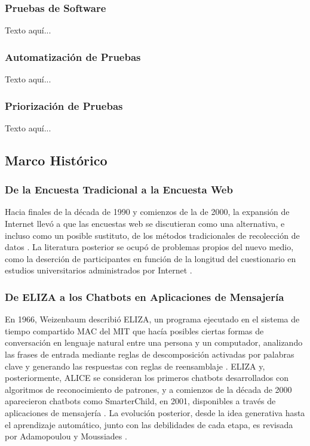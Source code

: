 \documentclass[12pt,letterpaper]{article}
\begin{document}
\subsubsection{Pruebas de Software}
Texto aquí...

\subsubsection{Automatización de Pruebas}
Texto aquí...

\subsubsection{Priorización de Pruebas}
Texto aquí...

\subsection{Marco Histórico}

\subsubsection{De la Encuesta Tradicional a la Encuesta Web}
 
Hacia finales de la década de 1990 y comienzos de la de 2000, la expansión de Internet llevó a que las encuestas web se discutieran como una alternativa, e incluso como un posible sustituto, de los métodos tradicionales de recolección de datos \cite{couper2000}. La literatura posterior se ocupó de problemas propios del nuevo medio, como la deserción de participantes en función de la longitud del cuestionario en estudios universitarios administrados por Internet \cite{hoerger2010}.
 
\subsubsection{De ELIZA a los Chatbots en Aplicaciones de Mensajería}
 
En 1966, Weizenbaum describió ELIZA, un programa ejecutado en el sistema de tiempo compartido MAC del MIT que hacía posibles ciertas formas de conversación en lenguaje natural entre una persona y un computador, analizando las frases de entrada mediante reglas de descomposición activadas por palabras clave y generando las respuestas con reglas de reensamblaje \cite{weizenbaum1966}. ELIZA y, posteriormente, ALICE se consideran los primeros chatbots desarrollados con algoritmos de reconocimiento de patrones, y a comienzos de la década de 2000 aparecieron chatbots como SmarterChild, en 2001, disponibles a través de aplicaciones de mensajería \cite{adamopoulou2020overview}. La evolución posterior, desde la idea generativa hasta el aprendizaje automático, junto con las debilidades de cada etapa, es revisada por Adamopoulou y Moussiades \cite{adamopoulou2020}.
 
\end{document}
